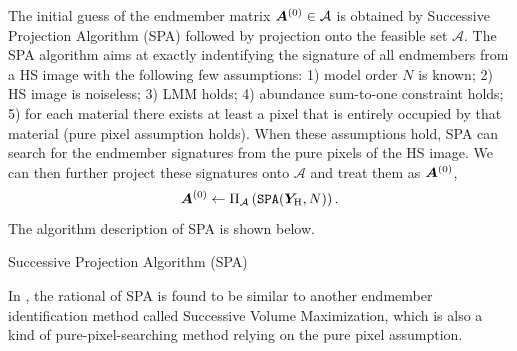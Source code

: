 The initial guess of the endmember matrix $\bm A^{(0)} \in \mathcal A$ is
obtained by Successive Projection Algorithm (SPA) \cite{SPA_CHEMOMETRICS2001,
SIGPROC_PERSP_ON_HU} followed by projection onto the feasible set $\mathcal A$.
The SPA algorithm aims at exactly indentifying the signature of all endmembers
from a HS image with the following few assumptions: 1) model order $N$ is
known; 2) HS image is noiseless; 3) LMM holds; 4) abundance sum-to-one
constraint holds; 5) for each material there exists at least a pixel that is
entirely occupied by that material (\ie pure pixel assumption holds).
When these assumptions hold, SPA can search for the endmember signatures from
the pure pixels of the HS image.
We can then further project these signatures onto $\mathcal A$ and treat them
as $\bm A^{(0)}$, \ie
\begin{equation}
    \bm A^{(0)} \gets \Pi_{\mathcal A}\left( \texttt{SPA}(\bm Y_\text H,N) \right).
\end{equation}
The algorithm description of SPA is shown below.
\begin{algorithm}
    \caption{Successive Projection Algorithm (SPA)}
    \begin{algorithmic}[1]
        \smallskip
        \smallskip
        \smallskip
            \smallskip
            \smallskip
            \smallskip
            \smallskip
            \smallskip
        \EndFor
        \smallskip
    \end{algorithmic}
\end{algorithm}

In \cite{SIGPROC_PERSP_ON_HU}, the rational of SPA is found to be similar to
another endmember identification method called Successive Volume Maximization,
which is also a kind of pure-pixel-searching method relying on the pure pixel
assumption.

